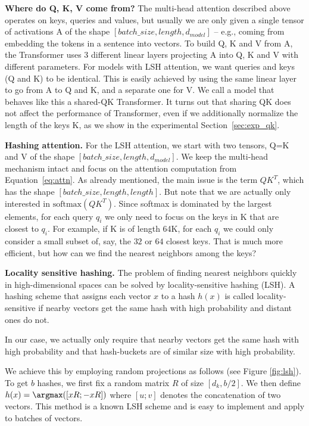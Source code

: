 \textbf{Where do Q, K, V come from?} The multi-head attention described above operates on keys, queries and values, but usually we are only given a single tensor of activations A of the shape $[batch\_size, length, d_{model}]$ -- e.g., coming from embedding the tokens in a sentence into vectors. To build Q, K and V from A, the Transformer uses 3 different linear layers projecting A into Q, K and V with different parameters. For models with LSH attention, we want queries and keys (Q and K) to be identical. This is easily achieved by using the same linear layer to go from A to Q and K, and a separate one for V. We call a model that behaves like this a shared-QK Transformer. It turns out that sharing QK does not affect the performance of Transformer, even if we additionally normalize the length of the keys K, as we show in the experimental Section~\ref{sec:exp_qk}.

\textbf{Hashing attention.} For the LSH attention, we start with two tensors, Q=K and V of the shape $[batch\_size, length, d_{model}]$. We keep the multi-head mechanism intact and focus on the attention computation from Equation~\ref{eq:attn}. As already mentioned, the main issue is the term $QK^T$, which has the shape
$[batch\_size, length, length]$. But note that we are actually only interested in $\mathrm{softmax}(QK^T)$. Since softmax is dominated by the largest elements, for each query $q_i$ we only need to focus on the keys in K that are closest to $q_i$. For example, if K is of length 64K, for each $q_i$ we could only consider a small subset of, say, the $32$ or $64$ closest keys. That is much more efficient, but how can we find the nearest neighbors among the keys?

\textbf{Locality sensitive hashing.} The problem of finding nearest neighbors quickly in high-dimensional spaces can be solved by locality-sensitive hashing (LSH). A hashing scheme that assigns each vector $x$ to a hash $h(x)$ is called locality-sensitive if nearby vectors get the same hash with high probability and distant ones do not.

In our case, we actually only require that nearby vectors get the same hash with high probability and that hash-buckets are of similar size with high probability.

We achieve this by employing random projections as follows (see Figure \ref{fig:lsh}).
To get $b$ hashes, we first fix a random matrix $R$ of size $[d_k, b/2]$. We then define $h(x) = \argmax([xR; -xR])$ where $[u; v]$ denotes the concatenation of two vectors. This method is a known LSH scheme \citep{andoni2015angularLSH} and is easy to implement and apply to batches of vectors.

